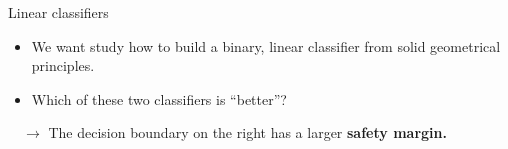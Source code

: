 \documentclass[11pt,compress,t,notes=noshow, xcolor=table]{beamer}
\begin{document}
\begin{vbframe}{Linear classifiers}
\vspace{-0.5em}

\begin{itemize}
    \item We want study how to build a binary, linear classifier 
      from solid geometrical principles.  
    \item Which of these two classifiers is \enquote{better}?
\end{itemize}
  
    $\quad \rightarrow$ The decision boundary on the right has a larger \textbf{safety margin.}


\end{vbframe}









\end{document}
